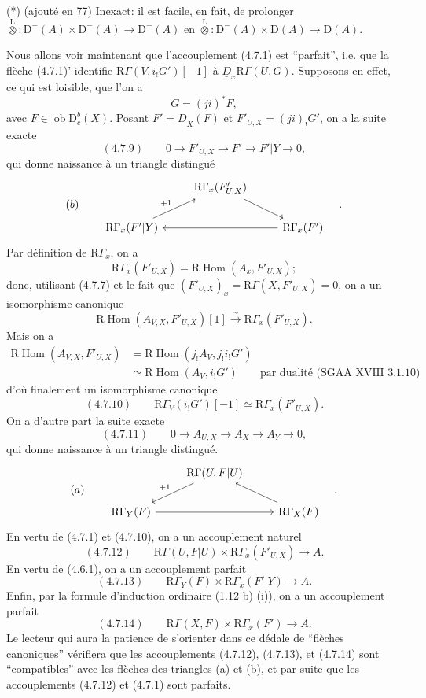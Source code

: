 \documentclass[11pt]{article}
\DeclareMathOperator{\Hom}{Hom}
\newcommand{\R}{\mathrm{R}}\newcommand{\RHomCore}{\mathrm{RHom}}
\newcommand{\D}{\mathrm{D}}
\newcommand{\ob}{\operatorname{ob}}
\providecommand{\Hom}{\operatorname{Hom}}
\providecommand{\ob}{\operatorname{ob}}
\providecommand{\R}{\mathrm R}
\providecommand{\Hom}{\operatorname{Hom}}
\begin{document}
(*) (ajouté en 77) Inexact: il est facile, en fait, de prolonger $\overset{\mathrm L}{\otimes}:\D^-(A)\times\D^-(A)\to\D^-(A)$ en $\overset{\mathrm L}{\otimes}:\D^-(A)\times\D(A)\to\D(A)$.

Nous allons voir maintenant que l'accouplement (4.7.1) est ``parfait'', i.e. que la flèche (4.7.1)' identifie $\R\Gamma(V,i_!G')[-1]$ à $\underline{D}_x\R\Gamma(U,G)$. Supposons en effet, ce qui est loisible, que l'on a
\[
G=(ji)^*F,
\]
avec $F\in\ob\D_c^b(X)$. Posant $F'=\underline{D}_X(F)$ et $F'_{U,X}=(ji)_!G'$, on a la suite exacte
\[
(4.7.9)\qquad 0\longrightarrow F'_{U,X}\longrightarrow F'\longrightarrow F'|Y\longrightarrow0,
\]
qui donne naissance à un triangle distingué
\[
(b)\qquad
\begin{tikzcd}
& \R\Gamma_x(F'_{U,X}) \arrow[dr] \\
\R\Gamma_x(F'|Y) \arrow[ur,"{+1}"] && \R\Gamma_x(F') \arrow[ll]
\end{tikzcd}\quad .
\]
Par définition de $\R\Gamma_x$, on a
\[
\R\Gamma_x(F'_{U,X})=\R\Hom(A_x,F'_{U,X});
\]
donc, utilisant (4.7.7) et le fait que $(F'_{U,X})_x=\R\Gamma(X,F'_{U,X})=0$, on a un isomorphisme canonique
\[
\R\Hom(A_{V,X},F'_{U,X})[1]\xrightarrow{\sim}\R\Gamma_x(F'_{U,X}).
\]
Mais on a
\[
\begin{aligned}
\R\Hom(A_{V,X},F'_{U,X})&=\R\Hom(j_!A_V,j_!i_!G')\\
&\simeq\R\Hom(A_V,i_!G')\qquad\text{par dualité (SGAA~XVIII~3.1.10)}
\end{aligned}
\]
d'où finalement un
isomorphisme canonique
\[
(4.7.10)\qquad \R\Gamma_V(i_!G')[-1]\simeq\R\Gamma_x(F'_{U,X}).
\]
On a d'autre part la suite exacte
\[
(4.7.11)\qquad 0\longrightarrow A_{U,X}\longrightarrow A_X\longrightarrow A_Y\longrightarrow0,
\]
qui donne naissance à un triangle distingué.
\[
(a)\qquad
\begin{tikzcd}
& \R\Gamma(U,F|U) \arrow[dl,"{+1}"'] \\
\R\Gamma_Y(F) \arrow[rr] && \R\Gamma_X(F) \arrow[ul]
\end{tikzcd}\quad .
\]
En vertu de (4.7.1) et (4.7.10), on a un accouplement naturel
\[
(4.7.12)\qquad \R\Gamma(U,F|U)\times\R\Gamma_x(F'_{U,X})\longrightarrow A.
\]
En vertu de (4.6.1), on a un accouplement parfait
\[
(4.7.13)\qquad \R\Gamma_Y(F)\times\R\Gamma_x(F'|Y)\longrightarrow A.
\]
Enfin, par la formule d'induction ordinaire (1.12 b) (i)), on a un accouplement parfait
\[
(4.7.14)\qquad \R\Gamma(X,F)\times\R\Gamma_x(F')\longrightarrow A.
\]
Le lecteur qui aura la patience de s'orienter dans ce dédale de ``flèches canoniques'' vérifiera que les accouplements (4.7.12), (4.7.13), et (4.7.14) sont ``compatibles'' avec les flèches des triangles (a) et (b), et par suite que les accouplements (4.7.12) et (4.7.1) sont parfaits.
\end{document}
